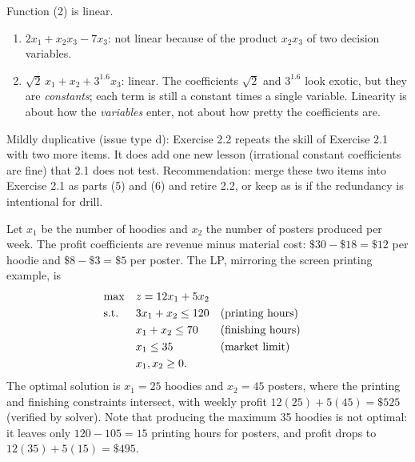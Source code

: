 
Function (2) is linear.
\begin{enumerate}
\item $2x_1 + x_2 x_3 - 7x_3$: not linear because of the product $x_2 x_3$ of two decision variables.
\item $\sqrt{2}\,x_1 + x_2 + 3^{1.6} x_3$: linear. The coefficients $\sqrt{2}$ and $3^{1.6}$ look exotic, but they are \emph{constants}; each term is still a constant times a single variable. Linearity is about how the \emph{variables} enter, not about how pretty the coefficients are.
\end{enumerate}

\begin{qaflag}
Mildly duplicative (issue type d): Exercise 2.2 repeats the skill of Exercise 2.1 with two more items. It does add one new lesson (irrational constant coefficients are fine) that 2.1 does not test. Recommendation: merge these two items into Exercise 2.1 as parts (5) and (6) and retire 2.2, or keep as is if the redundancy is intentional for drill.
\end{qaflag}


Let $x_1$ be the number of hoodies and $x_2$ the number of posters produced per week. The profit coefficients are revenue minus material cost: $\$30 - \$18 = \$12$ per hoodie and $\$8 - \$3 = \$5$ per poster. The LP, mirroring the screen printing example, is
\begin{align*}
\max \quad & z = 12x_1 + 5x_2\\
\text{s.t.}\;\; \quad & 3x_1 + x_2 \leq 120 && \text{(printing hours)}\\
& x_1 + x_2 \leq 70 && \text{(finishing hours)}\\
& x_1 \leq 35 && \text{(market limit)}\\
& x_1, x_2 \geq 0.
\end{align*}
The optimal solution is $x_1 = 25$ hoodies and $x_2 = 45$ posters, where the printing and finishing constraints intersect, with weekly profit $12(25) + 5(45) = \$525$ (verified by solver). Note that producing the maximum 35 hoodies is not optimal: it leaves only $120 - 105 = 15$ printing hours for posters, and profit drops to $12(35) + 5(15) = \$495$.


